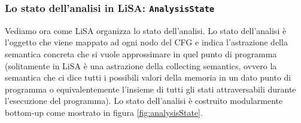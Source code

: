 \subsubsection{Lo stato dell'analisi in LiSA: \texttt{AnalysisState}}

Vediamo ora come LiSA organizza lo stato dell'analisi. Lo stato dell'analisi è l'oggetto che viene mappato ad ogni nodo del CFG e indica l'astrazione della semantica  concreta che si vuole approssimare in quel punto di programma (solitamente in LiSA è una astrazione della collecting semantics, ovvero la semantica che ci dice tutti i possibili valori della memoria in un dato punto di programma o equivalentemente l'insieme di tutti gli stati attraversabili durante l'esecuzione del programma). Lo stato dell'analisi è costruito modularmente bottom-up come mostrato in figura \ref{fig:analysisState}.

